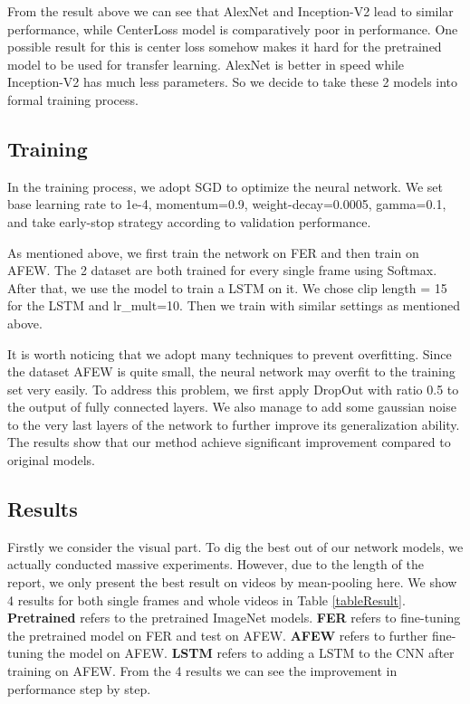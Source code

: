 \documentclass[10pt,twocolumn,letterpaper]{article}
\begin{document}
From the result above we can see that AlexNet and Inception-V2 lead to similar performance, while CenterLoss model is comparatively poor in performance. One possible result for this is center loss somehow makes it hard for the pretrained model to be used for transfer learning. AlexNet is better in speed while Inception-V2 has much less parameters. So we decide to take these 2 models into formal training process.



\subsection{Training}

In the training process, we adopt SGD to optimize the neural network. We set base learning rate to 1e-4, momentum=0.9, weight-decay=0.0005, gamma=0.1, and take early-stop strategy according to validation performance.

As mentioned above, we first train the network on FER and then train on AFEW. The 2 dataset are both trained for every single frame using Softmax. After that, we use the model to train a LSTM on it. We chose clip length = 15 for the LSTM and lr\_mult=10. Then we train with similar settings as mentioned above.

It is worth noticing that we adopt many techniques to prevent overfitting. Since the dataset AFEW is quite small, the neural network may overfit to the training set very easily. To address this problem, we first apply DropOut with ratio 0.5 to the output of fully connected layers. We also manage to add some gaussian noise to the very last layers of the network to further improve its generalization ability. The results show that our method achieve significant improvement compared to original models.

\subsection{Results}

Firstly we consider the visual part. To dig the best out of our network models, we actually conducted massive experiments. However, due to the length of the report, we only present the best result on videos by mean-pooling here. We show 4 results for both single frames and whole videos in Table \ref{tableResult}. \textbf{Pretrained} refers to the pretrained ImageNet models. \textbf{FER} refers to fine-tuning the pretrained model on FER and test on AFEW. \textbf{AFEW} refers to further fine-tuning the model on AFEW. \textbf{LSTM} refers to adding a LSTM to the CNN after training on AFEW. From the 4 results we can see the improvement in performance step by step.
\end{document}
